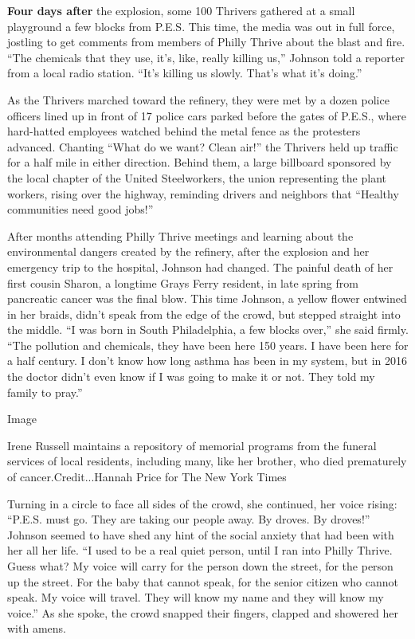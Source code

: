 \textbf{Four days after} the explosion, some 100 Thrivers gathered at a
small playground a few blocks from P.E.S. This time, the media was out
in full force, jostling to get comments from members of Philly Thrive
about the blast and fire. ``The chemicals that they use, it's, like,
really killing us,'' Johnson told a reporter from a local radio station.
``It's killing us slowly. That's what it's doing.''

As the Thrivers marched toward the refinery, they were met by a dozen
police officers lined up in front of 17 police cars parked before the
gates of P.E.S., where hard-hatted employees watched behind the metal
fence as the protesters advanced. Chanting ``What do we want? Clean
air!'' the Thrivers held up traffic for a half mile in either direction.
Behind them, a large billboard sponsored by the local chapter of the
United Steelworkers, the union representing the plant workers, rising
over the highway, reminding drivers and neighbors that ``Healthy
communities need good jobs!''

After months attending Philly Thrive meetings and learning about the
environmental dangers created by the refinery, after the explosion and
her emergency trip to the hospital, Johnson had changed. The painful
death of her first cousin Sharon, a longtime Grays Ferry resident, in
late spring from pancreatic cancer was the final blow. This time
Johnson, a yellow flower entwined in her braids, didn't speak from the
edge of the crowd, but stepped straight into the middle. ``I was born in
South Philadelphia, a few blocks over,'' she said firmly. ``The
pollution and chemicals, they have been here 150 years. I have been here
for a half century. I don't know how long asthma has been in my system,
but in 2016 the doctor didn't even know if I was going to make it or
not. They told my family to pray.''

Image

Irene Russell maintains a repository of memorial programs from the
funeral services of local residents, including many, like her brother,
who died prematurely of cancer.Credit...Hannah Price for The New York
Times

Turning in a circle to face all sides of the crowd, she continued, her
voice rising: ``P.E.S. must go. They are taking our people away. By
droves. By droves!'' Johnson seemed to have shed any hint of the social
anxiety that had been with her all her life. ``I used to be a real quiet
person, until I ran into Philly Thrive. Guess what? My voice will carry
for the person down the street, for the person up the street. For the
baby that cannot speak, for the senior citizen who cannot speak. My
voice will travel. They will know my name and they will know my voice.''
As she spoke, the crowd snapped their fingers, clapped and showered her
with amens.

